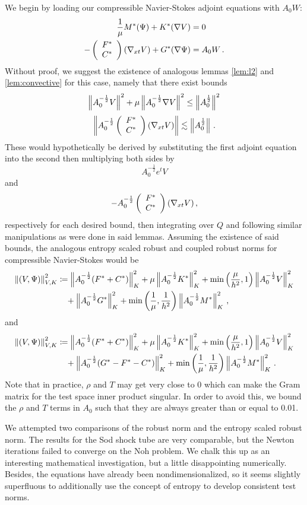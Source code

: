 \documentclass[Dissertation.tex]{subfiles}
\begin{document}
We begin by loading our compressible Navier-Stokes adjoint equations with $A_0W$:
\begin{align*}
\frac{1}{\mu}M^*(\Psi)+K^*(\nabla V)&=0
\\
-\left( \begin{array}{c} F^*\\ C^*\\ \end{array} \right)(\nabla_{xt} V)+G^*(\nabla\Psi)&=A_0W\,.
\end{align*}
Without proof, we suggest the existence of analogous lemmas \ref{lem:l2} and \ref{lem:convective}  
for this case, namely that there exist bounds
\begin{equation}
\left\| A_0^{-\frac{1}{2}}V \right\|^2+\mu\left\| A_0^{-\frac{1}{2}}\nabla V \right\|^2\leq\left\| A_0^\frac{1}{2} \right\|^2
\end{equation}
\begin{equation}
\left\| A_0^{-\frac{1}{2}}\left( \begin{array}{c} F^*\\ C^*\\ \end{array} \right)(\nabla_{xt} V) \right\|\lesssim\left\| A_0^\frac{1}{2} \right\|\,.
\end{equation}
These would hypothetically be derived by substituting the first adjoint equation into 
the second then multiplying both sides by
\[
A_0^{-\frac{1}{2}}e^tV
\]
and
\[
-A_0^{-\frac{1}{2}}\left( \begin{array}{c} F^*\\ C^*\\ \end{array} \right)(\nabla_{xt} V)\,,
\]
respectively for each desired bound, then integrating over $Q$ and following similar manipulations as were done in said lemmas.
Assuming the existence of said bounds, the analogous entropy scaled robust and coupled robust norms
for compressible Navier-Stokes would be
\begin{align*}
\left\| \left( V,\Psi \right) \right\|_{V,K}^2 &\coloneqq
\left\| A_0^{-\frac{1}{2}}(F^*+C^*) \right\|_K^2
+ \mu\left\| A_0^{-\frac{1}{2}}K^* \right\|_K^2
+ \min\left( \frac{\mu}{h^2},1 \right)\left\| A_0^{-\frac{1}{2}}V \right\|^2_K
\\\nonumber&\quad
+ \left\| A_0^{-\frac{1}{2}}G^* \right\|_K^2
+ \min\left( \frac{1}{\mu},\frac{1}{h^2} \right)\left\| A_0^{-\frac{1}{2}}M^* \right\|_K^2\,,
\end{align*}
and
\begin{align*}
\left\| \left( V,\Psi \right) \right\|_{V,K}^2 &\coloneqq
\left\| A_0^{-\frac{1}{2}}(F^*+C^*) \right\|_K^2
+ \mu\left\| A_0^{-\frac{1}{2}}K^* \right\|_K^2
+ \min\left( \frac{\mu}{h^2},1 \right)\left\| A_0^{-\frac{1}{2}}V \right\|^2_K
\\\nonumber&\quad
+ \left\| A_0^{-\frac{1}{2}}(G^*-F^*-C^*) \right\|_K^2
+ \min\left( \frac{1}{\mu},\frac{1}{h^2} \right)\left\| A_0^{-\frac{1}{2}}M^* \right\|_K^2\,.
\end{align*}
Note that in practice, $\rho$ and $T$ may get very close to 0 which can make the
Gram matrix for the test space inner product singular. In order to avoid this,
we bound the $\rho$ and $T$ terms in $A_0$ such that they are always greater than or equal
to 0.01.

We attempted two comparisons of the robust norm and the entropy scaled robust norm. 
The results for the Sod shock tube are very comparable, but the Newton iterations
failed to converge on the Noh problem.
We chalk this up as an interesting mathematical investigation, but a little disappointing numerically.
Besides, the equations have already been nondimensionalized, so it seems slightly superfluous
to additionally use the concept of entropy to develop consistent test norms.
\end{document}

